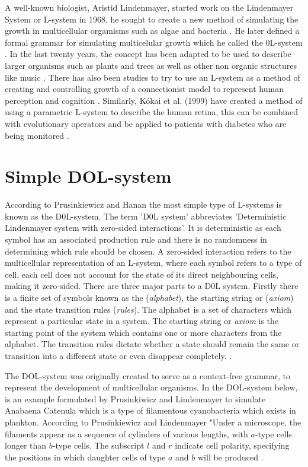 A well-known biologist, Aristid Lindenmayer, started work on the Lindenmayer System or L-system in 1968, he sought to create a new method of simulating the growth in multicellular orgamisms such as algae and bacteria \cite{lindenmayer1968mathematical}. He later defined a formal grammar for simulating multicelular growth which he called the 0L-system \cite {lindenmayer1971developmental}. In the last twenty years, the concept has been adapted to be used to describe larger organisms such as plants and trees as well as other non organic structures like music \cite{worth2005growing}. There has also been studies to try to use an L-system as a method of creating and controlling growth of a connectionist model to represent human perception and cognition \cite{vaario1991connectionist}. Similarly, K{\'o}kai et al. (1999) have created a method of using a parametric L-system to describe the human retina, this can be combined with evolutionary operators and be applied to patients with diabetes who are being monitored \cite{kokai1999parametric}.


\section{Simple DOL-system} \label{Simple DOL-systems}

According to Prusinkiewicz and Hanan the most simple type of L-systems is known as the D0L-system. The term 'D0L system' abbreviates 'Deterministic Lindenmayer system with zero-sided interactions'. It is deterministic as each symbol has an associated production rule and there is no randomness in determining which rule should be chosen. A zero-sided interaction refers to the multicellular representation of an L-system, where each symbol refers to a type of cell, each cell does not account for the state of its direct neighbouring cells, making it zero-sided. There are three major parts to a D0L system. Firstly there is a finite set of symbols known as the (\textit{alphabet}), the starting string or (\textit{axiom}) and the state transition rules (\textit{rules}). The alphabet is a set of characters which represent a particular state in a system. The starting string or \textit{axiom} is the starting point of the system which contains one or more characters from the alphabet. The transition rules dictate whether a state should remain the same or transition into a different state or even disappear completely. \cite{prusinkiewicz2013lindenmayer}. 

The DOL-system was originally created to serve as a context-free grammar, to represent the development of multicellular organisms. In the DOL-system below, is an example formulated by Prusinkiwicz and Lindenmayer to simulate Anabaena Catenula which is a type of filamentous cyanobacteria which exists in plankton. According to Prusinkiewicz and Lindenmayer "Under a microscope, the filaments appear as a sequence of cylinders of various lengths, with $a$-type cells longer than $b$-type cells. The subscript $l$ and $r$ indicate cell polarity, specifying the positions in which daughter cells of type $a$ and $b$ will be produced \cite{prusinkiewicz2012algorithmic}.

